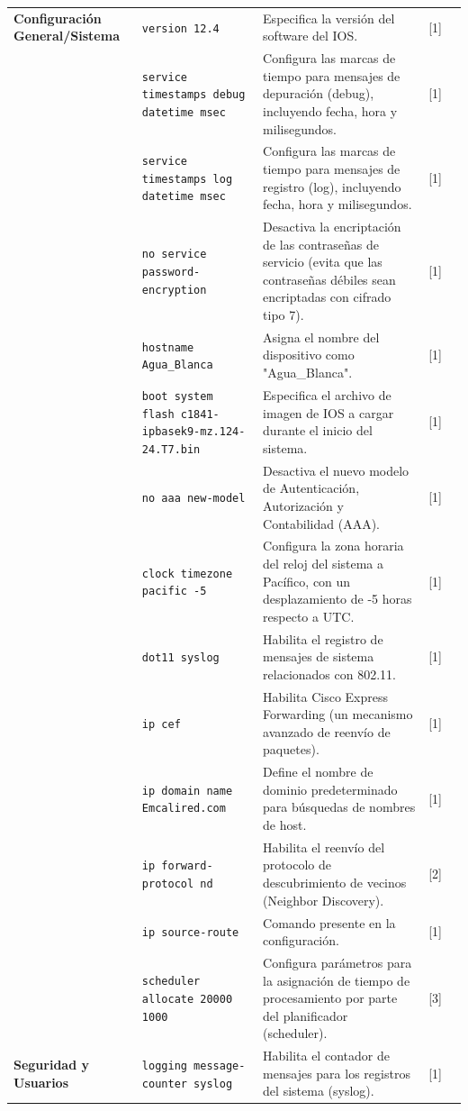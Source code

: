 \documentclass[a5paper]{book}%
\begin{document}
\begin{longtable}{|p{2cm}|p{3cm}|p{4cm}|p{2cm}|p{2cm}|}
\textbf{Configuración General/Sistema} & \texttt{version 12.4} & Especifica la versión del software del IOS. & [1] \\
& \texttt{service timestamps debug datetime msec} & Configura las marcas de tiempo para mensajes de depuración (debug), incluyendo fecha, hora y milisegundos. & [1] \\
& \texttt{service timestamps log datetime msec} & Configura las marcas de tiempo para mensajes de registro (log), incluyendo fecha, hora y milisegundos. & [1] \\
& \texttt{no service password-encryption} & Desactiva la encriptación de las contraseñas de servicio (evita que las contraseñas débiles sean encriptadas con cifrado tipo 7). & [1] \\
& \texttt{hostname Agua\_Blanca} & Asigna el nombre del dispositivo como "Agua\_Blanca". & [1] \\
& \texttt{boot system flash c1841-ipbasek9-mz.124-24.T7.bin} & Especifica el archivo de imagen de IOS a cargar durante el inicio del sistema. & [1] \\
& \texttt{no aaa new-model} & Desactiva el nuevo modelo de Autenticación, Autorización y Contabilidad (AAA). & [1] \\
& \texttt{clock timezone pacific -5} & Configura la zona horaria del reloj del sistema a Pacífico, con un desplazamiento de -5 horas respecto a UTC. & [1] \\
& \texttt{dot11 syslog} & Habilita el registro de mensajes de sistema relacionados con 802.11. & [1] \\
& \texttt{ip cef} & Habilita Cisco Express Forwarding (un mecanismo avanzado de reenvío de paquetes). & [1] \\
& \texttt{ip domain name Emcalired.com} & Define el nombre de dominio predeterminado para búsquedas de nombres de host. & [1] \\
& \texttt{ip forward-protocol nd} & Habilita el reenvío del protocolo de descubrimiento de vecinos (Neighbor Discovery). & [2] \\
& \texttt{ip source-route} & Comando presente en la configuración. & [1] \\
& \texttt{scheduler allocate 20000 1000} & Configura parámetros para la asignación de tiempo de procesamiento por parte del planificador (scheduler). & [3] \\
\textbf{Seguridad y Usuarios} & \texttt{logging message-counter syslog} & Habilita el contador de mensajes para los registros del sistema (syslog). & [1] \\

\end{longtable}
\end{document}
